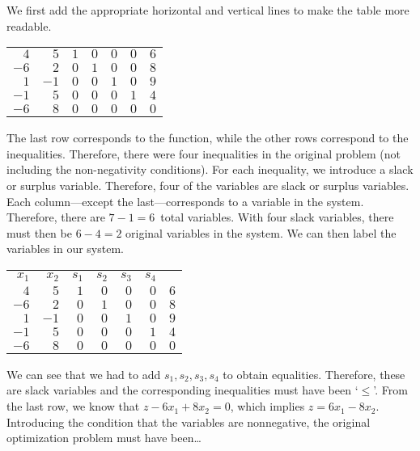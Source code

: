 \documentclass[12pt,letterpaper]{exam}
\begin{document}
\begin{questions}
\sol We first add the appropriate horizontal and vertical lines to make the table more readable. \par
	\begin{table}[!ht]
	\centering
	\begin{tabular}{rrrrrr|r}
	$4$ & $5$ & $1$ & $0$ & $0$ & $0$ & $6$ \\
	$-6$ & $2$ & $0$ & $1$ & $0$ & $0$ & $8$ \\
	$1$ & $-1$ & $0$ & $0$ & $1$ & $0$ & $9$ \\
	$-1$ & $5$ & $0$ & $0$ & $0$ & $1$ & $4$ \\ \hline
	$-6$ & $8$ & $0$ & $0$ & $0$ & $0$ & $0$
	\end{tabular}
	\end{table} \par
The last row corresponds to the function, while the other rows correspond to the inequalities. Therefore, there were four inequalities in the original problem (not including the non-negativity conditions). For each inequality, we introduce a slack or surplus variable. Therefore, four of the variables are slack or surplus variables. Each column---except the last---corresponds to a variable in the system. Therefore, there are $7 - 1= 6$~total variables. With four slack variables, there must then be $6 - 4= 2$ original variables in the system. We can then label the variables in our system. \par
	\begin{table}[!ht]
	\centering
	\begin{tabular}{rrrrrrr}
	{\footnotesize $x_1$} & {\footnotesize $x_2$} & {\footnotesize $s_1$} & {\footnotesize $s_2$} & {\footnotesize $s_3$} & {\footnotesize $s_4$} & \\ 
	$4$ & $5$ & $1$ & $0$ & $0$ & \multicolumn{1}{r|}{$0$} & $6$ \\
	$-6$ & $2$ & $0$ & $1$ & $0$ & \multicolumn{1}{r|}{$0$} & $8$ \\
	$1$ & $-1$ & $0$ & $0$ & $1$ & \multicolumn{1}{r|}{$0$} & $9$ \\
	$-1$ & $5$ & $0$ & $0$ & $0$ & \multicolumn{1}{r|}{$1$} & $4$ \\ \hline
	$-6$ & $8$ & $0$ & $0$ & $0$ & \multicolumn{1}{r|}{$0$} & $0$
	\end{tabular}
	\end{table} \par
We can see that we had to add $s_1, s_2, s_3, s_4$ to obtain equalities. Therefore, these are slack variables and the corresponding inequalities must have been `$\leq$'. From the last row, we know that $z - 6x_1 + 8x_2= 0$, which implies $z= 6x_1 - 8x_2$. Introducing the condition that the variables are nonnegative, the original optimization problem must have been\dots

\end{questions}
\end{document}
